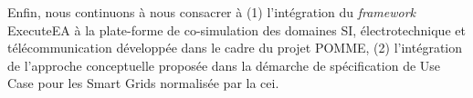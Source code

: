 Enfin, nous continuons à nous consacrer à (1) l'intégration du \emph{framework} ExecuteEA
à la plate-forme de co-simulation des domaines SI, électrotechnique et télécommunication
développée dans le cadre du projet POMME, (2) l'intégration de l'approche conceptuelle proposée
dans la démarche de spécification de Use Case pour les Smart Grids normalisée par la \gls{cei}.



